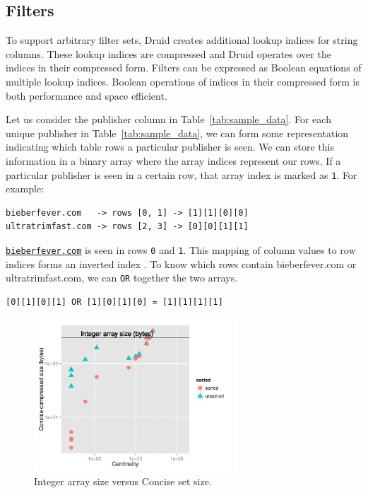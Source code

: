 \documentclass{vldb}
\begin{document}
\subsection{Filters}
To support arbitrary filter sets, Druid creates additional lookup
indices for string columns. These lookup indices are compressed and
Druid operates over the indices in their compressed form. Filters can
be expressed as Boolean equations of multiple lookup indices. Boolean
operations of indices in their compressed form is both performance and
space efficient.

Let us consider the publisher column in
Table~\ref{tab:sample_data}. For each unique publisher in
Table~\ref{tab:sample_data}, we can form some representation
indicating which table rows a particular publisher is seen. We can
store this information in a binary array where the array indices
represent our rows. If a particular publisher is seen in a certain
row, that array index is marked as \texttt{1}. For example:
\begin{verbatim}
bieberfever.com   -> rows [0, 1] -> [1][1][0][0]
ultratrimfast.com -> rows [2, 3] -> [0][0][1][1]
\end{verbatim}

\texttt{\href{http://bieberfever.com}{bieberfever.com}} is seen in rows \texttt{0} and \texttt{1}. This mapping of column values
to row indices forms an inverted index \cite{tomasic1993performance}. To know which
rows contain {\ttfamily bieberfever.com} or {\ttfamily ultratrimfast.com}, we can \texttt{OR} together
the two arrays.
\begin{verbatim}
[0][1][0][1] OR [1][0][1][0] = [1][1][1][1]
\end{verbatim}

\begin{figure}
\centering
\includegraphics[width = 3in]{concise_plot}
\caption{Integer array size versus Concise set size.}
\label{fig:concise_plot}
\end{figure}
\end{document}

